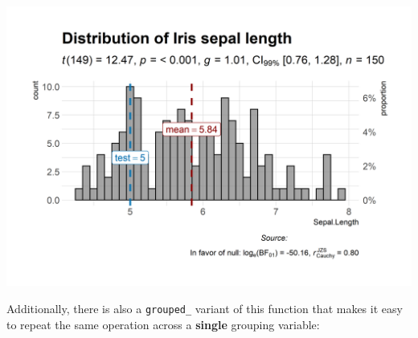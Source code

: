 \documentclass[]{article}
\begin{document}
\includegraphics[width=1\linewidth]{./figures/paper-gghistostats1-1}

Additionally, there is also a \texttt{grouped\_} variant of this
function that makes it easy to repeat the same operation across a
\textbf{single} grouping variable:
\end{document}
